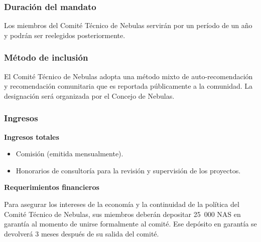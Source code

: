 \subsubsection{Duración del mandato}

Los miembros del Comité Técnico de Nebulas servirán por un período de un año y podrán ser reelegidos posteriormente.

\subsubsection{Método de inclusión}

El Comité Técnico de Nebulas adopta una método mixto de auto-recomendación y recomendación comunitaria que es reportada públicamente a la comunidad. La designación será organizada por el Concejo de Nebulas.

\subsubsection{Ingresos}

\textbf{Ingresos totales}

\begin{itemize}
	\item Comisión (emitida mensualmente).
	\item Honorarios de consultoría para la revisión y supervisión de los proyectos.
\end{itemize}

\vspace{2em}

\textbf{Requerimientos financieros}

Para asegurar los intereses de la economía y la continuidad de la política del Comité Técnico de Nebulas, sus miembros deberán depositar 25 000 NAS en garantía al momento de unirse formalmente al comité. Ese depósito en garantía se devolverá 3 meses después de su salida del comité.